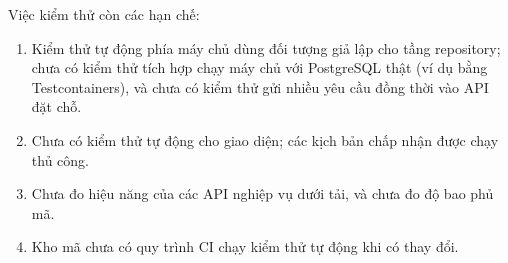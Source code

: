 Việc kiểm thử còn các hạn chế:
\begin{enumerate}
    \item Kiểm thử tự động phía máy chủ dùng đối tượng giả lập cho tầng repository; chưa có kiểm thử tích hợp chạy máy chủ với PostgreSQL thật (ví dụ bằng Testcontainers), và chưa có kiểm thử gửi nhiều yêu cầu đồng thời vào API đặt chỗ.
    \item Chưa có kiểm thử tự động cho giao diện; các kịch bản chấp nhận được chạy thủ công.
    \item Chưa đo hiệu năng của các API nghiệp vụ dưới tải, và chưa đo độ bao phủ mã.
    \item Kho mã chưa có quy trình CI chạy kiểm thử tự động khi có thay đổi.
\end{enumerate}

